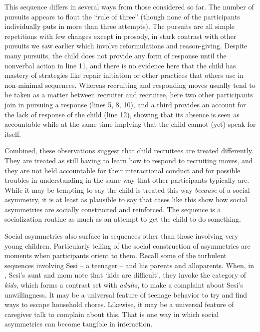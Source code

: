 \documentclass[output=paper]{langsci/langscibook}
\begin{document}
\normalsize
This sequence differs in several ways from those considered so far. The number of pursuits appears to flout the “rule of three” (though none of the participants individually puts in more than three attempts). The pursuits are all simple repetitions with few changes except in prosody, in stark contrast with other pursuits we saw earlier which involve reformulations and reason-giving. Despite many pursuits, the child does not provide any form of response until the nonverbal action in line 11, and there is no evidence here that the child has mastery of strategies like repair initiation or other practices that others use in non-minimal sequences. Whereas recruiting and responding moves usually tend to be taken as a matter between recruiter and recruitee, here two other participants join in pursuing a response (lines 5, 8, 10), and a third provides an account for the lack of response of the child (line 12), showing that its absence is seen as accountable while at the same time implying that the child cannot (yet) speak for itself.

Combined, these observations suggest that child recruitees are treated differently. They are treated as still having to learn how to respond to recruiting moves, and they are not held accountable for their interactional conduct and for possible troubles in understanding in the same way that other participants typically are. While it may be tempting to say the child is treated this way \textit{because} of a social asymmetry, it is at least as plausible to say that cases like this show how social asymmetries are socially constructed and reinforced. The sequence is a socialization routine as much as an attempt to get the child to do something.

Social asymmetries also surface in sequences other than those involving very young children. Particularly telling of the social construction of asymmetries are moments when participants orient to them. Recall some of the turbulent sequences involving Sesi -- a teenager -- and his parents and alloparents. When, in , Sesi’s aunt and mom note that ‘kids are difficult’, they invoke the category of \textit{kids}, which forms a contrast set with \textit{adults}, to make a complaint about Sesi’s unwillingness. It may be a universal feature of teenage behavior to try and find ways to escape household chores. Likewise, it may be a universal feature of caregiver talk to complain about this. That is one way in which social asymmetries can become tangible in interaction.
\end{document}
